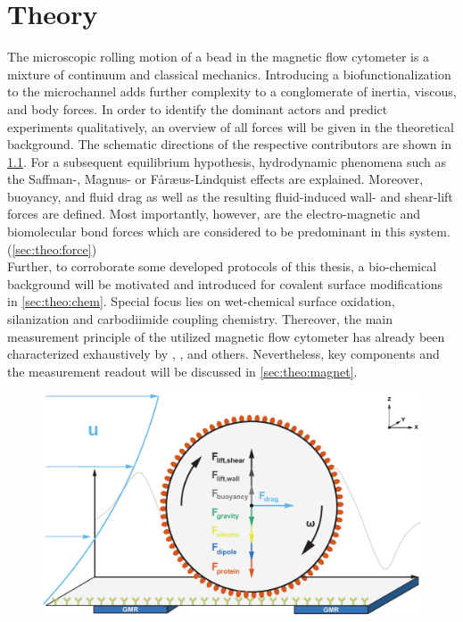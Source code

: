 \setcounter{page}{1}
\chapter{Theory}
The microscopic rolling motion of a bead in the magnetic flow cytometer is a mixture of continuum and classical mechanics. Introducing a biofunctionalization to the microchannel adds further complexity to a conglomerate of inertia, viscous, and body forces. In order to identify the dominant actors and predict experiments qualitatively, an overview of all forces will be given in the theoretical background. The schematic directions of the respective contributors are shown in \cref{fig:theo:figOne}. For a subsequent equilibrium hypothesis, hydrodynamic phenomena such as the Saffman-, Magnus- or F\aa{}r\ae{}us-Lindquist effects are explained. Moreover, buoyancy, and fluid drag as well as the resulting fluid-induced wall- and shear-lift forces are defined. Most importantly, however, are the electro-magnetic and biomolecular bond forces which are considered to be predominant in this system.(\cref{sec:theo:force})\\
Further, to corroborate some developed protocols of this thesis, a bio-chemical background will be motivated and introduced for covalent surface modifications in \cref{sec:theo:chem}. Special focus lies on wet-chemical surface oxidation, silanization and carbodiimide coupling chemistry. Thereover, the main measurement principle of the utilized magnetic flow cytometer has already been characterized exhaustively by \citet{lit:thes:helou}, \citet{lit:thes:reisbeck}, and others.\cite{lit:thes:esthi,lit:thes:brenner} Nevertheless, key components and the measurement readout will be discussed in \cref{sec:theo:magnet}.
\begin{figure}[!htb]
	\centering
	\includegraphics[width=.75\linewidth]{Ressources/Fluidic/FigureOne}
	\label{fig:theo:figOne}
\end{figure}

